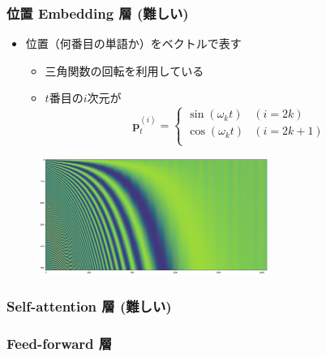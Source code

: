 \documentclass[14pt]{beamer}
\begin{document}
\begin{frame}
	\frametitle{位置 Embedding 層 {\small (難しい)}}

	\begin{itemize}
		\item 位置（何番目の単語か）をベクトルで表す
			\begin{itemize}
				\item 三角関数の回転を利用している
				\item $t$番目の$i$次元が
					\[
						\bm{p}_t^{(i)}
						=
						\begin{cases}
							\sin \left( \omega_k t \right) & (i = 2k) \\
							\cos \left( \omega_k t \right) & (i = 2k + 1) \\
						\end{cases}
					\]
			\end{itemize}
	\end{itemize}
	\begin{figure}[H]
		\centering
		\includegraphics[width=7.5cm]{posenc.png}
	\end{figure}
\end{frame}

\begin{frame}
	\frametitle{Self-attention 層 {\small (難しい)}}

\end{frame}

\begin{frame}
	\frametitle{Feed-forward 層}

\end{frame}
\end{document}
